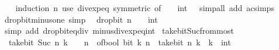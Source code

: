 \begin{isabellebody}
%
\isadelimproof
\ \ %
\endisadelimproof
%
\isatagproof
{}\isamarkupfalse%
\ {\isacharparenleft}{\kern0pt}induction\ n{\isacharparenright}{\kern0pt}\ {\isacharparenleft}{\kern0pt}use\ div{\isacharunderscore}{\kern0pt}exp{\isacharunderscore}{\kern0pt}eq\ {\isacharbrackleft}{\kern0pt}symmetric{\isacharcomma}{\kern0pt}\ of\ {\isacartoucheopen}{\isacharminus}{\kern0pt}\ {}\ {\isacharcolon}{\kern0pt}{\isacharcolon}{\kern0pt}\ int{\isacartoucheclose}\ {}{\isacharbrackright}{\kern0pt}\ \ {\isacartoucheopen}simp{\isacharunderscore}{\kern0pt}all\ add{\isacharcolon}{\kern0pt}\ ac{\isacharunderscore}{\kern0pt}simps{\isacartoucheclose}{\isacharparenright}{\kern0pt}%
\endisatagproof
{\isafoldproof}%
%
\isadelimproof
\isanewline
%
\endisadelimproof
\isanewline
{}\isamarkupfalse%
\ drop{\isacharunderscore}{\kern0pt}bit{\isacharunderscore}{\kern0pt}minus{\isacharunderscore}{\kern0pt}one\ {\isacharbrackleft}{\kern0pt}simp{\isacharbrackright}{\kern0pt}{\isacharcolon}{\kern0pt}\isanewline
\ \ {\isacartoucheopen}drop{\isacharunderscore}{\kern0pt}bit\ n\ {\isacharparenleft}{\kern0pt}{\isacharminus}{\kern0pt}\ {}\ {\isacharcolon}{\kern0pt}{\isacharcolon}{\kern0pt}\ int{\isacharparenright}{\kern0pt}\ {\isacharequal}{\kern0pt}\ {\isacharminus}{\kern0pt}\ {}{\isacartoucheclose}\isanewline
%
\isadelimproof
\ \ %
\endisadelimproof
%
\isatagproof
{}\isamarkupfalse%
\ {\isacharparenleft}{\kern0pt}simp\ add{\isacharcolon}{\kern0pt}\ drop{\isacharunderscore}{\kern0pt}bit{\isacharunderscore}{\kern0pt}eq{\isacharunderscore}{\kern0pt}div\ minus{\isacharunderscore}{\kern0pt}{}{\isacharunderscore}{\kern0pt}div{\isacharunderscore}{\kern0pt}exp{\isacharunderscore}{\kern0pt}eq{\isacharunderscore}{\kern0pt}int{\isacharparenright}{\kern0pt}%
\endisatagproof
{\isafoldproof}%
%
\isadelimproof
\isanewline
%
\endisadelimproof
\isanewline
{}\isamarkupfalse%
\ take{\isacharunderscore}{\kern0pt}bit{\isacharunderscore}{\kern0pt}Suc{\isacharunderscore}{\kern0pt}from{\isacharunderscore}{\kern0pt}most{\isacharcolon}{\kern0pt}\isanewline
\ \ {\isacartoucheopen}take{\isacharunderscore}{\kern0pt}bit\ {\isacharparenleft}{\kern0pt}Suc\ n{\isacharparenright}{\kern0pt}\ k\ {\isacharequal}{\kern0pt}\ {}\ {\isacharcircum}{\kern0pt}\ n\ {\isacharasterisk}{\kern0pt}\ of{\isacharunderscore}{\kern0pt}bool\ {\isacharparenleft}{\kern0pt}bit\ k\ n{\isacharparenright}{\kern0pt}\ {\isacharplus}{\kern0pt}\ take{\isacharunderscore}{\kern0pt}bit\ n\ k{\isacartoucheclose}\ \ k\ {\isacharcolon}{\kern0pt}{\isacharcolon}{\kern0pt}\ int\isanewline

\end{isabellebody}
